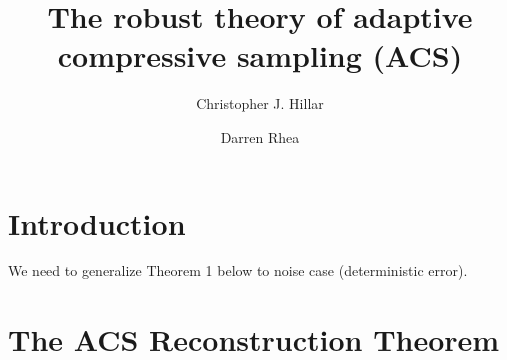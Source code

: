 \documentclass[11pt]{amsart}
\title[The robust theory of adaptive compressive sampling]{The robust theory of adaptive \\ compressive sampling (ACS)}
\author[C.J. Hillar]{Christopher J. Hillar}
\author[D. Rhea]{Darren Rhea}
\begin{document}
\maketitle

\section{Introduction}

We need to generalize Theorem 1 below to noise case (deterministic error).

\section{The ACS Reconstruction Theorem}

\end{document}
